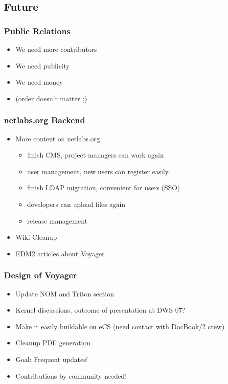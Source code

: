 \documentclass{beamer}
\begin{document}
\subsection{Future}
\begin{frame}
\frametitle{Public Relations}
\begin{itemize}[<+->]
  \item We need more contributors
  \item We need publicity
  \item We need money
  \item (order doesn't matter ;)
\end{itemize}
\end{frame}

\begin{frame}
\frametitle{netlabs.org Backend}
\begin{itemize}[<+->] 
  \item More content on netlabs.org
  \begin{itemize}[<+->]
    \item finish CMS, project managers can work again
    \item user management, new users can register easily
    \item finish LDAP migration, convenient for users (SSO)
    \item developers can upload files again
    \item release management
  \end{itemize}
  \item Wiki Cleanup
  \item EDM2 articles about Voyager
\end{itemize}
\end{frame}

\begin{frame}
\frametitle{Design of Voyager}
\begin{itemize}[<+->]
  \item Update NOM and Triton section
  \item Kernel discussions, outcome of presentation at DWS 07?
  \item Make it easily buildable on eCS (need contact with DocBook/2 crew)
  \item Cleanup PDF generation
  \item Goal: Frequent updates!
  \item Contributions by community needed!
\end{itemize}
\end{frame}
\end{document}
